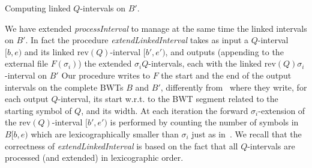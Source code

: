 \documentclass[runningheads,envcountsame,a4paper]{llncs}
\makeatletter
\newcommand{\paragrafo}{%
  \@startsection{paragraph}{4}{\z@ }{-7\p@ \@plus -4\p@ \@minus -4\p@
  }{-0.5em \@plus -0.22em \@minus -0.1em}{\normalfont \normalsize \itshape
  }
}
\newcommand{\notaestesa}[2]{%
 \marginpar{\color{red!75!black}\textbf{\texttimes}}%
 {\color{red!75!black}%
 [\,\textbullet\,\textsf{\textbf{#1:}} %
 \textsf{\footnotesize#2}\,\textbullet\,]}%
}
\newcommand{\wrt}{w.r.t.\xspace}
\newcommand{\rev}{\ensuremath{\mathrm{rev}}}
\makeatother
\begin{document}
\paragrafo{Computing  linked $Q$-intervals on $B'$.}

We have extended \emph{processInterval} to manage at the same time  the linked intervals on
$B'$.
In fact the procedure \emph{extendLinkedInterval}
takes as input a $Q$-interval $[b,e)$ and its linked
$\rev(Q)$-interval $[b',e')$, and outputs (appending to the external file $F(\sigma_{i})$)
the extended $\sigma_i Q$-intervals, each  with the linked $\rev(Q)
\sigma_i$-interval on $B'$
Our procedure writes to $F$ the start and the end of the output intervals on the
complete BWTs $B$ and $B'$, differently from~\cite{Cox2012} where they write, for each output $Q$-interval, its start \wrt to the BWT segment related to the starting symbol of $Q$, and its width.
At each iteration the forward $\sigma_i$-extension
of the $\rev(Q)$-interval $[b',e')$ is performed by counting
the number of symbols in $B[b,e)$ which are lexicographically smaller than
$\sigma_i$ just as in~\cite{Simpson2010}.
We recall that the correctness of \emph{extendLinkedInterval} is based on the
fact that all $Q$-intervals are processed (and extended) in lexicographic order.








\begin{comment}
More precisely, the steps .... in algorithm \emph{extendLinkedInterval}
directly provides the values of the new $\sigma Q$-interval and such
value is appended at the end of the new updated list (or file), in order
to maintain the lexicographic ordering.
In fact, the sorted property of the file, allows to update the files
while reading the files themselves, thus minimizing the operations on the
file.
\notaestesa{PB}{nota bene il passo dal 3 al 9 non si capisce come sia
implementato in termini di memoria esterna ed interna - io sarei per
descrivere la procedura extendLinkedInterval- dettagliandola rispetto
ai linked intervals, che però vanno definiti prima, in termini
costruttivi}.


Intervals $[b,e)$ in $\mathcal{Q}_j$ represent common strings $Q$ of
length $(j+\tau)$.
Their link to the $\rev(Q)$-interval $[b',e')$ on $B'$ is easily
maintained (during the backward extension of the intervals of length
$(j+\tau-1)$ to produce the intervals in $\mathcal{Q}_j$) by Prop.~\ref{proposition:linked-intervals}.
This list is partioned into $|\Sigma|$ files according to the starting
symbol of $Q$, and maintained sorted by ascending value of the start
$b$.
\end{comment}
\end{document}
